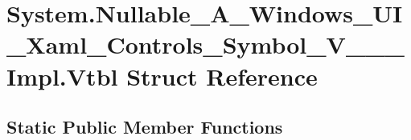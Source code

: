 \hypertarget{struct_system_1_1_nullable___a___windows___u_i___xaml___controls___symbol___v_______impl_1_1_vtbl}{}\section{System.\+Nullable\+\_\+\+A\+\_\+\+Windows\+\_\+\+U\+I\+\_\+\+Xaml\+\_\+\+Controls\+\_\+\+Symbol\+\_\+\+V\+\_\+\+\_\+\+\_\+\+Impl.\+Vtbl Struct Reference}
\label{struct_system_1_1_nullable___a___windows___u_i___xaml___controls___symbol___v_______impl_1_1_vtbl}
\subsection*{Static Public Member Functions}
